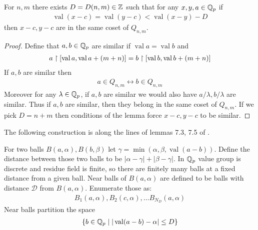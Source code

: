 \documentclass{amsart}
\newcommand{\D}{\mathcal D}
\newcommand{\curly}[1]{\left\{#1\right\}}
\DeclareMathOperator{\Bt}{Bt}
\DeclareMathOperator{\val}{val}
\begin{document}
\begin{Lemma} \label{distance}
  For $n,m$ there exists $D = D(n,m) \in \mathbb{Z}$ such that for any $x,y,a \in \mathbb{Q}_p$ if
  \begin{align*}
    \val (x - c) = \val (y - c) < \val (x - y) - D
  \end{align*}
  then $x - c, y - c$ are in the same coset of $Q_{n,m}$.
\end{Lemma}
\begin{proof}
  Define that $a,b \in \mathbb{Q}_p$ are similar if $\val a = \val b$ and
  \begin{align*}
    a \midr [\val a, \val a + (m + n)] = b \midr [\val b, \val b + (m + n)]
  \end{align*}
  If $a,b$ are similar then
  \begin{align*}
    a \in Q_{n,m} \leftrightarrow b \in Q_{n,m}
  \end{align*}
  Moreover for any $\lambda \in \mathbb{Q}_p$, if $a,b$ are similar we would also have $a/\lambda, b/\lambda$ are similar.
  Thus if $a,b$ are similar, then they belong in the same coset of $Q_{n,m}$.
  If we pick $D = n + m$ then conditions of the lemma force $x - c, y - c$ to be similar.
\end{proof} 

The following construction is along the lines of lemmas 7.3, 7.5 of \cite{density}.

\begin{Definition}
  For two balls $B(a, \alpha), B(b, \beta)$ let $\gamma = \min(\alpha, \beta, \val(a - b))$.
  Define the distance between those two balls to be $|\alpha - \gamma| + |\beta - \gamma|$.
  In $\mathbb{Q}_p$ value group is discrete and residue field is finite, so there are finitely many balls at a fixed distance from a given ball.
  Near balls of $B(a, \alpha)$ are defined to be balls with distance $\D$ from $B(a, \alpha)$.
  Enumerate those as:
  \begin{align*}
    B_1(a, \alpha), B_2(c, \alpha), \ldots B_{N_D}(a, \alpha)
  \end{align*}
  Near balls partition the space
  \begin{align*}
    \curly{b \in \Q_p \mid |\val(a - b) - \alpha| \leq D}
  \end{align*}
\end{Definition}

\end{document}
